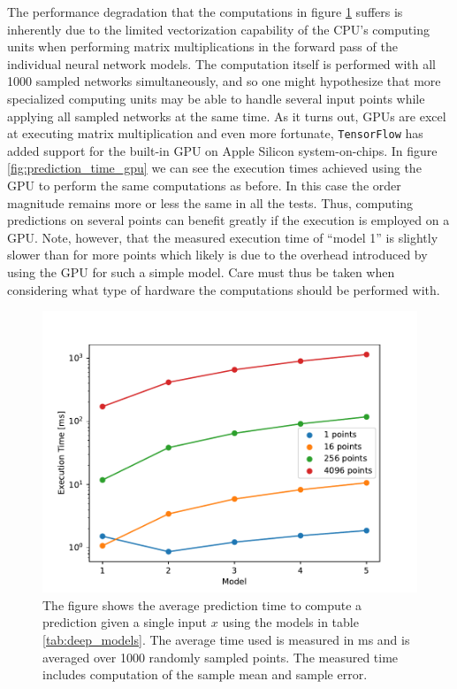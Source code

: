 The performance degradation that the computations in figure \ref{fig:prediction_time} suffers is inherently due to the limited vectorization capability of the CPU's computing units when performing matrix multiplications in the forward pass of the individual neural network models. The computation itself is performed with all 1000 sampled networks simultaneously, and so one might hypothesize that more specialized computing units may be able to handle several input points while applying all sampled networks at the same time. As it turns out, GPUs are excel at executing matrix multiplication and even more fortunate, {\tt TensorFlow} has added support for the built-in GPU on Apple Silicon system-on-chips. In figure \ref{fig:prediction_time_gpu} we can see the execution times achieved using the GPU to perform the same computations as before. In this case the order magnitude remains more or less the same in all the tests. Thus, computing predictions on several points can benefit greatly if the execution is employed on a GPU. Note, however, that the measured execution time of ``model 1'' is slightly slower than for more points which likely is due to the overhead introduced by using the GPU for such a simple model. Care must thus be taken when considering what type of hardware the computations should be performed with.

\begin{figure}[h!]
    \centering
    \includegraphics[scale=0.7]{figures/prediction_time/prediction_time.pdf}
    \caption{The figure shows the average prediction time to compute a prediction given a single input $x$ using the models in table \ref{tab:deep_models}. The average time used is measured in ms and is averaged over 1000 randomly sampled points. The measured time includes computation of the sample mean and sample error.
    }
    \label{fig:prediction_time}
\end{figure}

